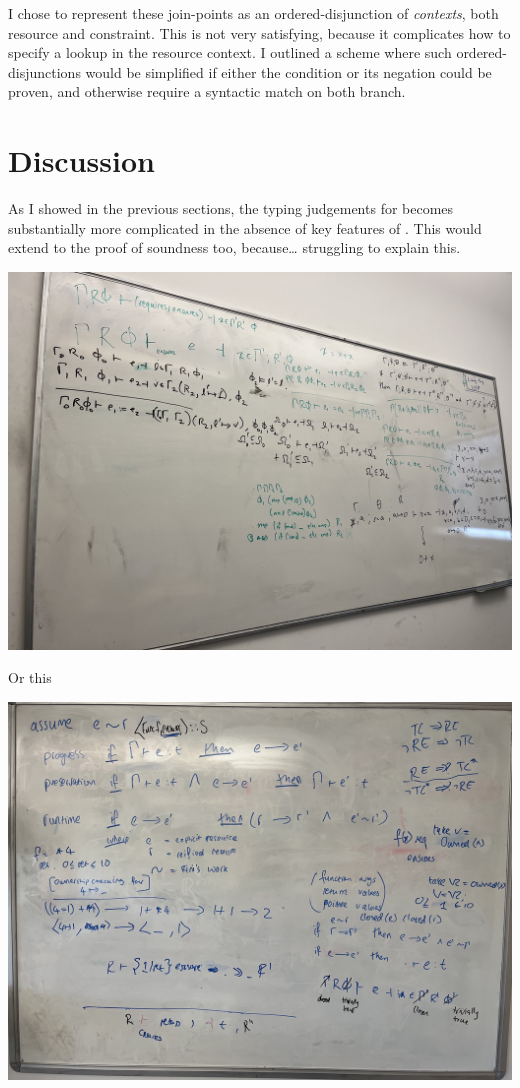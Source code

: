 I chose to represent these join-points as an ordered-disjunction of
\emph{contexts}, both resource and constraint. This is not very satisfying,
because it complicates how to specify a lookup in the resource context. I
outlined a scheme where such ordered-disjunctions would be simplified if either
the condition or its negation could be proven, and otherwise require a
syntactic match on both branch.

\section{Discussion}

As I showed in the previous sections, the typing judgements for 
becomes substantially more complicated in the absence of key features of
. This would extend to the proof of soundness too, because\ldots
struggling to explain this.

\includegraphics{../misc/minicn-soundness}

Or this

\includegraphics{../misc/runtime-correctness}

